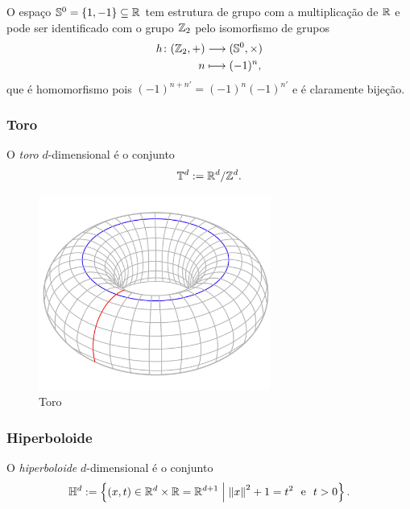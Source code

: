 O espaço $\mathbb{S}^0 = \{1,-1\} \subseteq \mathbb{R}$ tem estrutura de grupo com a multiplicação de $\mathbb{R}$ e pode ser identificado com o grupo $\mathbb{Z}_2$ pelo isomorfismo de grupos
	\begin{align*}
	{h}\colon {(\mathbb{Z}_2,+)} &\longrightarrow {(\mathbb{S}^0,\times)} \\{n} &\longmapsto (-1)^n,
	\end{align*}
que é homomorfismo pois $(-1)^{n+n'} = (-1)^n(-1)^{n'}$ e é claramente bijeção.

\subsubsection{Toro}

\begin{definition}
	O \emph{toro} $d$-dimensional é o conjunto
	\begin{equation*}
	\mathbb{T}^d := \mathbb{R}^d / \mathbb{Z}^d.
	\end{equation*}
\end{definition}

\begin{figure}[!h]
\centering
\includegraphics[width=3in]{./imagens/toro}
\caption{Toro}
\end{figure}

\subsubsection{Hiperboloide}

\begin{definition}
O \emph{hiperboloide} $d$-dimensional é o conjunto
	\begin{equation*}
	\mathbb{H}^d := \left\{{(x,t) \in \mathbb{R}^d \times \mathbb{R} = \mathbb{R}^{d+1}}\;\middle\vert\;{\left\Vert{x}\right\Vert^2+1=t^2 \text{\ \ e\ \ } t>0}\right\}.
	\end{equation*}
\end{definition}





